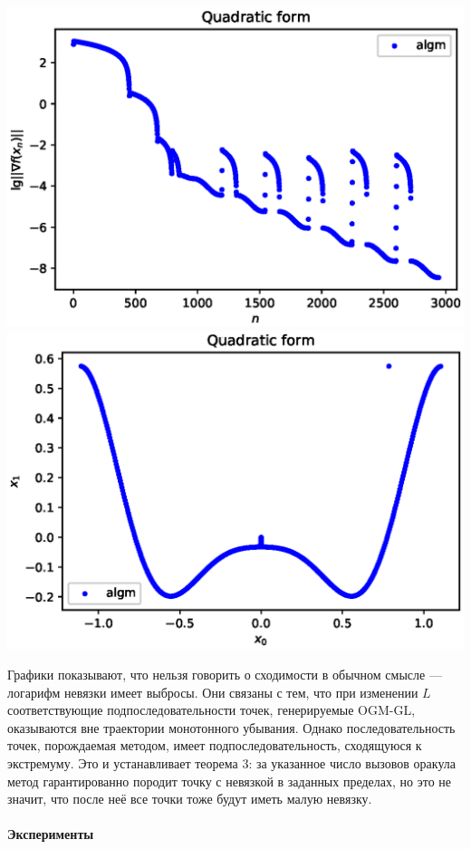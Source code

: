 \documentclass{crm-article}
\begin{document}
\noindent
\includegraphics[scale=0.5]{plots/ill_algm_sqr_des.eps}
\includegraphics[scale=0.5]{plots/xy_algm_sqr_des.eps}

Графики показывают, что нельзя говорить о сходимости в обычном смысле --- логарифм невязки имеет выбросы. Они связаны с тем, что при изменении $L$ соответствующие подпоследовательности точек, генерируемые OGM-GL, оказываются вне траектории монотонного убывания. Однако последовательность точек, порождаемая методом, имеет подпоследовательность, сходящуюся к экстремуму. Это и устанавливает теорема 3: за указанное число вызовов оракула метод гарантированно породит точку с невязкой в заданных пределах, но это не значит, что после неё все точки тоже будут иметь малую невязку.

\paragraph{Эксперименты}
\end{document}
